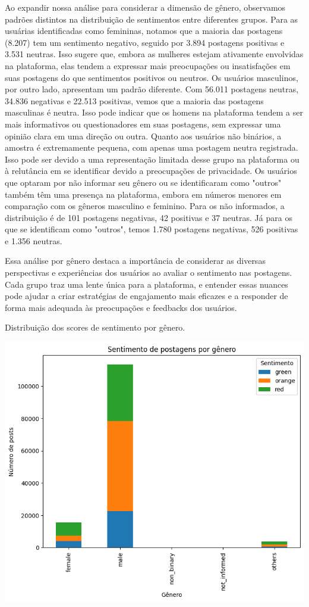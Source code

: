 Ao expandir nossa análise para considerar a dimensão de gênero, observamos padrões distintos na distribuição de sentimentos entre diferentes grupos. Para as usuárias identificadas como femininas, notamos que a maioria das postagens (8.207) tem um sentimento negativo, seguido por 3.894 postagens positivas e 3.531 neutras. Isso sugere que, embora as mulheres estejam ativamente envolvidas na plataforma, elas tendem a expressar mais preocupações ou insatisfações em suas postagens do que sentimentos positivos ou neutros. Os usuários masculinos, por outro lado, apresentam um padrão diferente. Com 56.011 postagens neutras, 34.836 negativas e 22.513 positivas, vemos que a maioria das postagens masculinas é neutra. Isso pode indicar que os homens na plataforma tendem a ser mais informativos ou questionadores em suas postagens, sem expressar uma opinião clara em uma direção ou outra. Quanto aos usuários não binários, a amostra é extremamente pequena, com apenas uma postagem neutra registrada. Isso pode ser devido a uma representação limitada desse grupo na plataforma ou à relutância em se identificar devido a preocupações de privacidade. Os usuários que optaram por não informar seu gênero ou se identificaram como "outros" também têm uma presença na plataforma, embora em números menores em comparação com os gêneros masculino e feminino. Para os não informados, a distribuição é de 101 postagens negativas, 42 positivas e 37 neutras. Já para os que se identificam como "outros", temos 1.780 postagens negativas, 526 positivas e 1.356 neutras.

Essa análise por gênero destaca a importância de considerar as diversas perspectivas e experiências dos usuários ao avaliar o sentimento nas postagens. Cada grupo traz uma lente única para a plataforma, e entender essas nuances pode ajudar a criar estratégias de engajamento mais eficazes e a responder de forma mais adequada às preocupações e feedbacks dos usuários.

\begin{quadro}[!htb]
	\caption{Distribuição dos scores de sentimento por gênero.}
	\label{fig:sentiment_by_gender}
	\centering
	\includegraphics[scale=0.8]{images/sentiment_by_gender.png}
	\fautor
\end{quadro}

